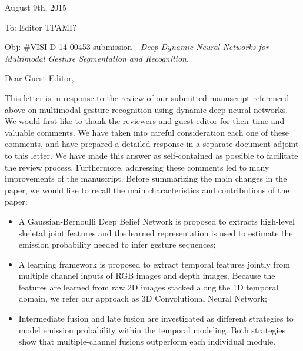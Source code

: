 \documentclass[12pt]{article}
\begin{document}
\begin{center}
\end{center}

\newcommand{\rev}[1]{{\noindent {\bf Comment:} {\it #1}}~\\}
\newcommand{\ans}[1]{{\noindent {\bf Response:} #1}~\\}


\begin{flushleft}
August 9th, 2015
\end{flushleft}

\vspace*{3mm}

\begin{flushleft}
To: Editor TPAMI?
\end{flushleft}

\begin{flushleft}
Obj: \#VISI-D-14-00453 submission - {\em Deep Dynamic Neural Networks for Multimodal Gesture
Segmentation and Recognition}.
\end{flushleft}

\vspace*{3mm}

\pagestyle{empty}

\noindent Dear Guest Editor,
\newline

This letter is in response to the review of our submitted manuscript referenced above on 
multimodal gesture recognition using dynamic deep neural networks.
%
We would first like to thank  the reviewers and guest editor for their time and valuable comments.
We have taken into careful consideration each one of these comments, and have prepared a detailed response
in a separate document adjoint to this letter. 
We have made this answer as self-contained as possible to facilitate the review process.
%
Furthermore, addressing these comments led to many improvements of the manuscript. 
%
Before summarizing the main changes in the paper, we would like to recall the main characteristics and 
contributions of the paper:
\begin{itemize}
\item A Gaussian-Bernoulli Deep Belief Network is proposed to extracts high-level skeletal joint features and the learned representation is used to estimate the emission probability needed to infer gesture sequences;
\item A learning framework is proposed to extract temporal features jointly from multiple channel inputs of RGB images and depth images. Because the features are learned from raw 2D images stacked along the 1D temporal domain, we refer our approach as 3D Convolutional Neural Network;
\item Intermediate fusion and late fusion are investigated as different strategies to model emission probability within the temporal modeling. Both strategies show that multiple-channel fusions outperform each individual module.
\end{itemize}
\end{document}
